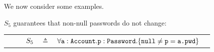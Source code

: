 We now consider some examples.

%  

{
 \begin{example}
 \label{example:twostate}
 $S_5$  guarantees   that   non-null passwords do not change:
 \\
 \begin{tabular}{lcll}
$\strut \ \ \ \ \ \ \ \ S_5$ & $\triangleq$   & ${\TwoStatesN {\prg{a}:\prg{Account}.\prg{p}:\prg{Password}}  {\prg{null}\neq \prg{p}=\prg{a.\password}}} $  \end{tabular}
 \end{example} 
 }
 
